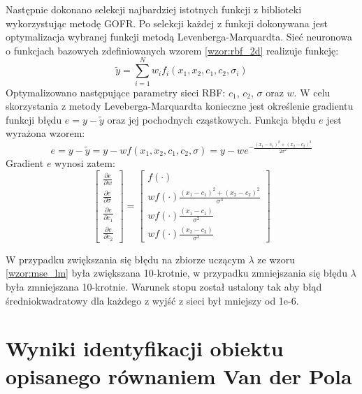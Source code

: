Następnie dokonano selekcji najbardziej istotnych funkcji z biblioteki wykorzystując metodę GOFR. Po selekcji każdej z funkcji dokonywana jest optymalizacja wybranej funkcji metodą Levenberga-Marquardta. Sieć neuronowa o funkcjach bazowych zdefiniowanych wzorem \ref{wzor:rbf_2d} realizuje funkcję:
\begin{equation}
	\tilde{y} = \sum_{i=1}^N w_i f_i(x_1,x_2,c_1,c_2,\sigma_i)
\end{equation}
Optymalizowano następujące parametry sieci RBF: $c_1$, $c_2$, $\sigma$ oraz $w$. W celu skorzystania z metody Leveberga-Marquardta konieczne jest określenie gradientu funkcji błędu $e = y - \tilde{y}$ oraz jej pochodnych cząstkowych. Funkcja błędu $e$ jest wyrażona wzorem:
\begin{equation}
	e = y - \tilde{y} = y - w f(x_1,x_2,c_1,c_2,\sigma) = y - w e^{-\frac{(x_1-c_1)^2 + (x_2-c_2)^2}{2 \sigma^2}} 
\end{equation}
Gradient $e$ wynosi zatem:
\begin{equation}
\begin{bmatrix}
	\frac{\partial e}{\partial w} \\
	\frac{\partial e}{\partial \sigma} \\
	\frac{\partial e}{\partial c_1} \\
	\frac{\partial e}{\partial c_2}
\end{bmatrix} = 
\begin{bmatrix}
	f(\cdot) \\
	w f(\cdot) \frac{(x_1 - c_1)^2 + (x_2 - c_2)^2}{\sigma^3}\\
	w f(\cdot) \frac{(x_1 - c_1)}{\sigma^2}\\
	w f(\cdot) \frac{(x_2 - c_2)}{\sigma^2}	
\end{bmatrix}
\end{equation}

W przypadku zwiększania się błędu na zbiorze uczącym $\lambda$ ze wzoru \ref{wzor:mse_lm} była zwiększana 10-krotnie, w przypadku zmniejszania się błędu $\lambda$ była zmniejszana 10-krotnie. Warunek stopu został ustalony tak aby błąd średniokwadratowy dla każdego z wyjść z sieci był mniejszy od 1e-6. 




\clearpage
\section{Wyniki identyfikacji obiektu opisanego równaniem Van der Pola}

